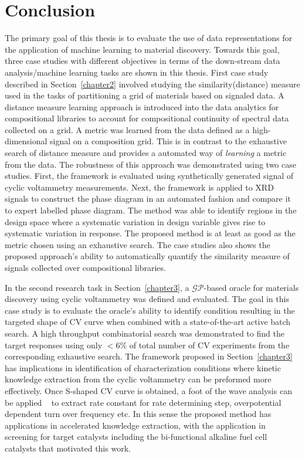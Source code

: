 \chapter{Conclusion}\label{Chapter 5}
The primary goal of this thesis is to evaluate the use of data representations for the application of machine learning to material discovery.
Towards this goal, three case studies with different objectives in terms of the down-stream data analysis/machine learning tasks are shown in this thesis. 
First case study described in Section~\ref{chapter2} involved studying the similarity(distance) measure used in the tasks of partitioning a grid of materials based on signaled data.
A distance measure learning approach is introduced into the data analytics for compositional libraries to account for compositional continuity of spectral data collected on a grid. 
A metric was learned from the data defined as a high-dimensional signal on a composition grid. 
This is in contrast to the exhaustive search of distance measure and provides a automated way of \textit{learning} a metric from the data.
The robustness of this approach was demonstrated using two case studies. 
First, the framework is evaluated using synthetically generated signal of cyclic voltammetry measurements. 
Next, the framework is applied to XRD signals to construct the phase diagram in an automated fashion and compare it to expert labelled phase diagram.
The method was able to identify regions in the design space where a systematic variation in design variable gives rise to systematic variation in response.
The proposed method is at least as good as the metric chosen using an exhaustive search.
The case studies also shows the proposed approach's ability to automatically quantify the similarity measure of signals collected over compositional libraries. 


In the second research task in Section~\ref{chapter3}, a \(\mathcal{GP}\)-based oracle for materials discovery using cyclic voltammetry was defined and evaluated.
The goal in this case study is to evaluate the oracle's ability to identify condition resulting in the targeted shape of CV curve when combined with a state-of-the-art active batch search.
A high throughput combinatorial search was demonstrated to find the target responses using only \(<6\%\) of total number of CV experiments from the corresponding exhaustive search. 
The framework proposed in Section~\ref{chapter3} has implications in identification of characterization conditions where kinetic knowledge extraction from the cyclic voltammetry can be preformed more effectively. 
Once S-shaped CV curve is obtained, a foot of the wave analysis can be applied ~\cite{FOWA} to extract rate constant for rate determining step, overpotential dependent turn over frequency etc.
In this sense the proposed method has applications in accelerated knowledge extraction, with the application in screening for target catalysts including the bi-functional alkaline fuel cell catalysts that motivated this work.


